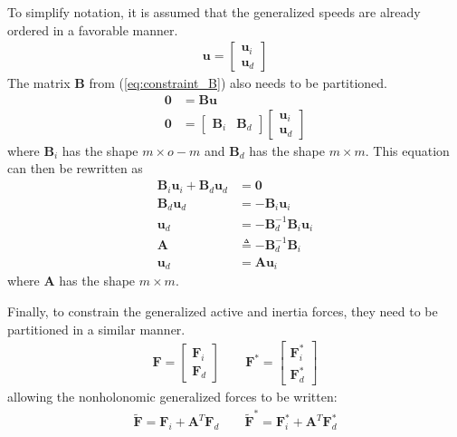 \documentclass[smallcondensed,final]{svjour3}                     %
\begin{document}
To simplify notation, it is assumed that the generalized speeds are already
ordered in a favorable manner.
\begin{align}
\label{eq:speeds_independent_dependent}
\mathbf{u} =
\begin{bmatrix}
\mathbf{u}_i \\
\mathbf{u}_d
\end{bmatrix}
\end{align}
The matrix $\mathbf{B}$ from (\ref{eq:constraint_B}) also needs to be
partitioned.
\begin{align}
\label{eq:constraint_B_independent_dependent}
\mathbf{0} &= \mathbf{B} \mathbf{u}\\
\mathbf{0} &= \begin{bmatrix}
\mathbf{B}_i & \mathbf{B}_d
\end{bmatrix} \begin{bmatrix}
\mathbf{u}_i \\ \mathbf{u}_d
\end{bmatrix}
\end{align}
where $\mathbf{B}_i$ has the shape $m \times o - m$ and $\mathbf{B}_d$ has the
shape $m \times m$.
This equation can then be rewritten as
\begin{align}
\label{eq:constraint_A}
\mathbf{B}_i \mathbf{u}_i + \mathbf{B}_d \mathbf{u}_d &= \mathbf{0} \\
\mathbf{B}_d \mathbf{u}_d &= - \mathbf{B}_i \mathbf{u}_i \\
\mathbf{u}_d &= -\mathbf{B}_d^{-1} \mathbf{B}_i \mathbf{u}_i \\
\mathbf{A} &\triangleq - \mathbf{B}_d^{-1} \mathbf{B}_i \\
\mathbf{u}_d &= \mathbf{A} \mathbf{u}_i
\end{align}
where $\mathbf{A}$ has the shape $m \times m$.

Finally, to constrain the generalized active and inertia forces, they need to
be partitioned in a similar manner.
\begin{align}
\label{eq:F_Fstar_rewrite}
\mathbf{F} = \begin{bmatrix} \mathbf{F}_i \\ \mathbf{F}_d \end{bmatrix} \quad
\quad \mathbf{F}^* = \begin{bmatrix} \mathbf{F}^*_i \\ \mathbf{F}^*_d
\end{bmatrix}
\end{align}
allowing the nonholonomic generalized forces to be written:
\begin{align}
\label{eq:F_Fstar_nonholonomic}
\tilde{\mathbf{F}} = \mathbf{F}_i + \mathbf{A}^T \mathbf{F}_d \quad \quad
\tilde{\mathbf{F}}^* = \mathbf{F}_i^* + \mathbf{A}^T \mathbf{F}_d^*
\end{align}
\end{document}
